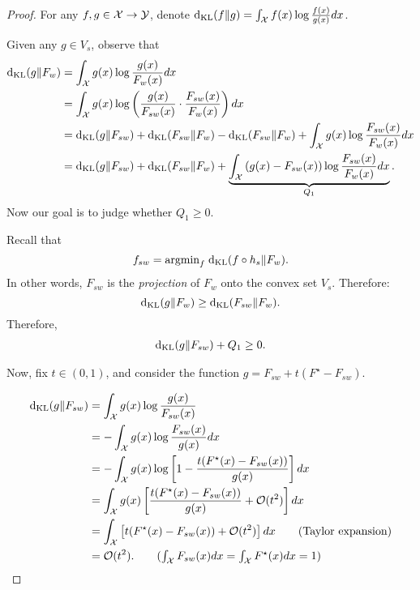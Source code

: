 \begin{proof}

For any $f,g \in \mathcal{X} \to \mathcal{Y}$, denote $ \mathrm{d}_{\mathrm{KL}}(f \| g) = \int_{\mathcal{X}} f(x) \log \frac{f(x)}{g(x)} d x$.

Given any $g \in V_s$, observe that
\begin{align} \label{eqn:square-expansion-main}
    \mathrm{d}_{\mathrm{KL}}(g \| F_w) &= \int_{\mathcal{X}} g(x) \log \frac{g(x)}{F_w(x)} d x \nonumber \\
    &= \int_{\mathcal{X}} g(x) \log \left( \frac{g(x)}{F_{sw}(x)} \cdot \frac{F_{sw}(x)}{F_w(x)} \right) d x \nonumber \\
    &=\mathrm{d}_{\mathrm{KL}}(g \| F_{sw}) + \mathrm{d}_{\mathrm{KL}}(F_{sw} \| F_w) - \mathrm{d}_{\mathrm{KL}}(F_{sw} \| F_w) + \int_{\mathcal{X}} g(x) \log  \frac{F_{sw}(x)}{F_w(x)} d x \nonumber \\
    &=\mathrm{d}_{\mathrm{KL}}(g \| F_{sw}) + \mathrm{d}_{\mathrm{KL}}(F_{sw} \| F_w) + \underbrace{\int_{\mathcal{X}} \left( g(x) - F_{sw}(x) \right) \log  \frac{F_{sw}(x)}{F_w(x)} d x}_{Q_1}.
\end{align}
Now our goal is to judge whether $Q_1 \ge 0$.

Recall that $$f_{sw} = \text{argmin}_{f}\; \mathrm{d}_{\mathrm{KL}}(f \circ h_s \| F_w).$$
In other words, $F_{sw}$ is the \textit{projection} of $F_w$ onto the convex set $V_s$. 
Therefore:
$$\mathrm{d}_{\mathrm{KL}}(g \| F_w) \ge \mathrm{d}_{\mathrm{KL}}(F_{sw} \| F_w).$$
Therefore, 
\begin{align} \label{eqn:cross-term-inequality-1-main}
\mathrm{d}_{\mathrm{KL}}(g \| F_{sw}) + Q_1 \ge 0. 
\end{align}

Now, fix $t \in (0,1)$, and consider the function $g=F_{sw}+t(F^\star-F_{sw})$.

\begin{align*}
    \kl(g \| F_{sw}) & = \int_\cX g(x) \log \frac{g(x)}{F_{sw}(x)}
    \\ & = -\int_\cX g(x) \log \frac{F_{sw}(x)}{g(x)} d x
    \\ & = - \int_\cX g(x) \log \left[1-\frac{t(F^\star(x)-F_{sw}(x))}{g(x)}\right] d x
    \\ & = \int_\cX g(x) \left[\frac{t(F^\star(x)-F_{sw}(x))}{g(x)} + \cO(t^2)\right] d x
    \\ & = \int_\cX \left[t(F^\star(x)-F_{sw}(x)) + \cO(t^2)\right] d x \tag{Taylor expansion}
    \\ & = \cO(t^2). \tag{$\int_\cX F_{sw}(x) d x = \int_\cX F^\star(x) d x = 1$}
\end{align*}


\end{proof}
